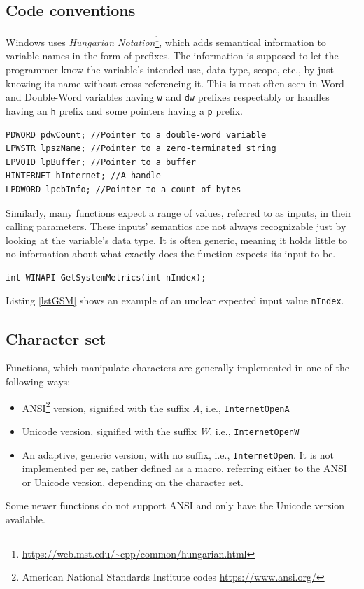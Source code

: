 \subsection*{Code conventions}
Windows uses \textit{Hungarian Notation}\footnote{\url{https://web.mst.edu/~cpp/common/hungarian.html}}, which adds semantical information to variable names in the form of prefixes. The information is supposed to let the programmer know the variable's intended use, data type, scope, etc., by just knowing its name without cross-referencing it. This is most often seen in Word and Double-Word variables having \lstinline{w} and \lstinline{dw} prefixes respectably or handles having an \lstinline{h} prefix and some pointers having a \lstinline{p} prefix.\cite{WinConventions}

\begin{lstlisting}[caption={An example of hungarian notation}]
PDWORD pdwCount; //Pointer to a double-word variable
LPWSTR lpszName; //Pointer to a zero-terminated string
LPVOID lpBuffer; //Pointer to a buffer
HINTERNET hInternet; //A handle
LPDWORD lpcbInfo; //Pointer to a count of bytes
\end{lstlisting}

Similarly, many functions expect a range of values, referred to as inputs, in their calling parameters. These inputs' semantics are not always recognizable just by looking at the variable's data type. It is often generic, meaning it holds little to no information about what exactly does the function expects its input to be.
\begin{lstlisting}[caption={GetSystemMetrics prototype},label=lstGSM]
int WINAPI GetSystemMetrics(int nIndex);
\end{lstlisting}
Listing \ref{lstGSM} shows an example of an unclear expected input value \lstinline{nIndex}.\cite{WinGetSM}

\subsection*{Character set}
Functions, which manipulate characters are generally implemented in one of the following ways:
\begin{itemize}
    \item ANSI\footnote{American National Standards Institute codes \url{https://www.ansi.org/}} version, signified with the suffix \textit{A}, i.e., \lstinline{InternetOpenA}
    \item Unicode version, signified with the suffix \textit{W}, i.e., \lstinline{InternetOpenW}
    \item An adaptive, generic version, with no suffix, i.e., \lstinline{InternetOpen}. It is not implemented per se, rather defined as a macro, referring either to the ANSI or Unicode version, depending on the character set.
\end{itemize}
Some newer functions do not support ANSI and only have the Unicode version available.\cite{WinUnicode}

